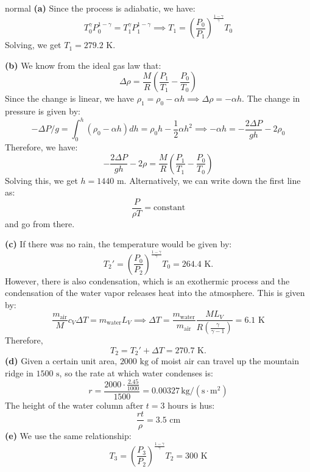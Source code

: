 \begin{solution}{normal}
\textbf{(a)} Since the process is adiabatic, we have:
$$T_0^\gamma P_0^{1-\gamma}=T_1^\gamma P_1^{1-\gamma} \implies T_1 = \left(\frac{P_{0}}{P_{1}}\right)^{\frac{1-\gamma}{\gamma}} T_{0}$$Solving, we get $T_1=279.2 \text{ K}$.
\vspace{2mm}

\textbf{(b)} We know from the ideal gas law that:
$$\Delta \rho = \frac{M}{R}\left(\frac{P_1}{T_1}-\frac{P_0}{T_0}\right)$$Since the change is linear, we have $\rho_1=\rho_0-\alpha h \implies \Delta \rho = -\alpha h$. The change in pressure is given by:
$$-\Delta P /g = \int_0^h (\rho_0-\alpha h) dh = \rho_0 h - \frac{1}{2}\alpha h^2 \implies -\alpha h = -\frac{2\Delta P}{gh}-2\rho_0$$Therefore, we have:
$$-\frac{2\Delta P}{gh}-2\rho = \frac{M}{R}\left(\frac{P_1}{T_1}-\frac{P_0}{T_0}\right)$$Solving this, we get $h=1440 \text{ m}$. Alternatively, we can write down the first line as:
$$\frac{P}{\rho T}=\text{constant}$$and go from there.
\vspace{2mm}

\textbf{(c)} If there was no rain, the temperature would be given by:
$$T_2'=\left(\frac{P_0}{P_2}\right)^\frac{1-\gamma}{\gamma}T_0=264.4 \text{ K}.$$However, there is also condensation, which is an exothermic process and the condensation of the water vapor releases heat into the atmosphere. This is given by:
$$\frac{m_\text{air}}{M}c_V\Delta T = m_\text{water}L_V\implies \Delta T = \frac{m_\text{water}}{m_\text{air}}\frac{ML_V}{R\left(\frac{\gamma}{\gamma-1}\right)}=6.1 \text{ K}$$Therefore,
$$T_2=T_2'+\Delta T=270.7 \text{ K}.$$
\textbf{(d)} Given a certain unit area, $2000 \text{ kg}$ of moist air can travel up the mountain ridge in $1500 \text{ s}$, so the rate at which water condenses is:
$$r=\frac{2000\cdot \frac{2.45}{1000}}{1500}=0.00327 \,\mathrm{ kg/(s\cdot m^2)}$$The height of the water column after $t=3 \text{ hours}$ is hus:
$$\frac{rt}{\rho}=3.5 \text{ cm}$$
\textbf{(e)} We use the same relationship:
$$T_3=\left(\frac{P_3}{P_2}\right)^\frac{1-\gamma}{\gamma}T_2=300 \text{ K}$$
\end{solution}
